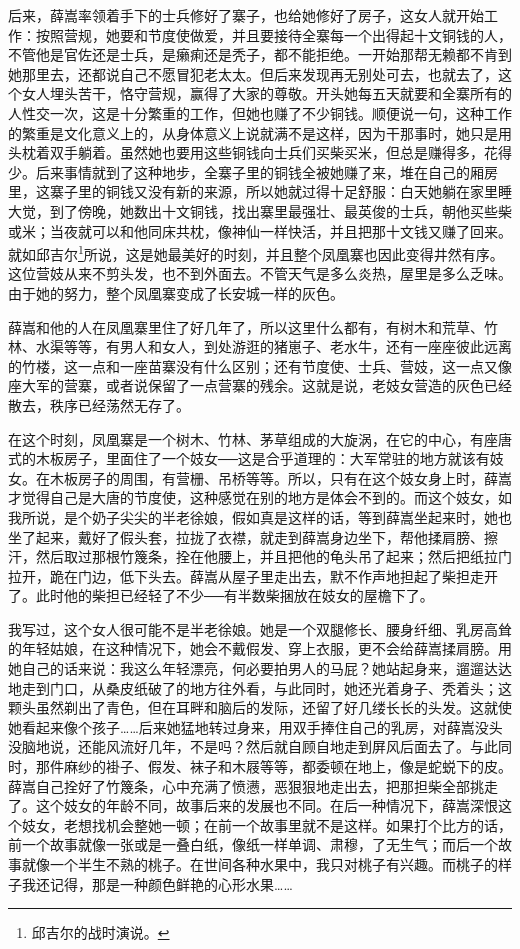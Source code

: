 后来，薛嵩率领着手下的士兵修好了寨子，也给她修好了房子，这女人就开始工作：按照营规，她要和节度使做爱，并且要接待全寨每一个出得起十文铜钱的人，不管他是官佐还是士兵，是癞痢还是秃子，都不能拒绝。一开始那帮无赖都不肯到她那里去，还都说自己不愿冒犯老太太。但后来发现再无别处可去，也就去了，这个女人埋头苦干，恪守营规，赢得了大家的尊敬。开头她每五天就要和全寨所有的人性交一次，这是十分繁重的工作，但她也赚了不少铜钱。顺便说一句，这种工作的繁重是文化意义上的，从身体意义上说就满不是这样，因为干那事时，她只是用头枕着双手躺着。虽然她也要用这些铜钱向士兵们买柴买米，但总是赚得多，花得少。后来事情就到了这种地步，全寨子里的铜钱全被她赚了来，堆在自己的厢房里，这寨子里的铜钱又没有新的来源，所以她就过得十足舒服：白天她躺在家里睡大觉，到了傍晚，她数出十文铜钱，找出寨里最强壮、最英俊的士兵，朝他买些柴或米；当夜就可以和他同床共枕，像神仙一样快活，并且把那十文钱又赚了回来。就如邱吉尔\footnote{邱吉尔的战时演说。 }所说，这是她最美好的时刻，并且整个凤凰寨也因此变得井然有序。这位营妓从来不剪头发，也不到外面去。不管天气是多么炎热，屋里是多么乏味。由于她的努力，整个凤凰寨变成了长安城一样的灰色。 

薛嵩和他的人在凤凰寨里住了好几年了，所以这里什么都有，有树木和荒草、竹林、水渠等等，有男人和女人，到处游逛的猪崽子、老水牛，还有一座座彼此远离的竹楼，这一点和一座苗寨没有什么区别；还有节度使、士兵、营妓，这一点又像座大军的营寨，或者说保留了一点营寨的残余。这就是说，老妓女营造的灰色已经散去，秩序已经荡然无存了。 

在这个时刻，凤凰寨是一个树木、竹林、茅草组成的大旋涡，在它的中心，有座唐式的木板房子，里面住了一个妓女──这是合乎道理的：大军常驻的地方就该有妓女。在木板房子的周围，有营栅、吊桥等等。所以，只有在这个妓女身上时，薛嵩才觉得自己是大唐的节度使，这种感觉在别的地方是体会不到的。而这个妓女，如我所说，是个奶子尖尖的半老徐娘，假如真是这样的话，等到薛嵩坐起来时，她也坐了起来，戴好了假头套，拉拢了衣襟，就走到薛嵩身边坐下，帮他揉肩膀、擦汗，然后取过那根竹篾条，拴在他腰上，并且把他的龟头吊了起来；然后把纸拉门拉开，跪在门边，低下头去。薛嵩从屋子里走出去，默不作声地担起了柴担走开了。此时他的柴担已经轻了不少──有半数柴捆放在妓女的屋檐下了。 

我写过，这个女人很可能不是半老徐娘。她是一个双腿修长、腰身纤细、乳房高耸的年轻姑娘，在这种情况下，她会不戴假发、穿上衣服，更不会给薛嵩揉肩膀。用她自己的话来说：我这么年轻漂亮，何必要拍男人的马屁？她站起身来，遛遛达达地走到门口，从桑皮纸破了的地方往外看，与此同时，她还光着身子、秃着头；这颗头虽然剃出了青色，但在耳畔和脑后的发际，还留了好几缕长长的头发。这就使她看起来像个孩子……后来她猛地转过身来，用双手捧住自己的乳房，对薛嵩没头没脑地说，还能风流好几年，不是吗？然后就自顾自地走到屏风后面去了。与此同时，那件麻纱的褂子、假发、袜子和木屐等等，都委顿在地上，像是蛇蜕下的皮。薛嵩自己拴好了竹篾条，心中充满了愤懑，恶狠狠地走出去，把那担柴全部挑走了。这个妓女的年龄不同，故事后来的发展也不同。在后一种情况下，薛嵩深恨这个妓女，老想找机会整她一顿；在前一个故事里就不是这样。如果打个比方的话，前一个故事就像一张或是一叠白纸，像纸一样单调、肃穆，了无生气；而后一个故事就像一个半生不熟的桃子。在世间各种水果中，我只对桃子有兴趣。而桃子的样子我还记得，那是一种颜色鲜艳的心形水果…… 




